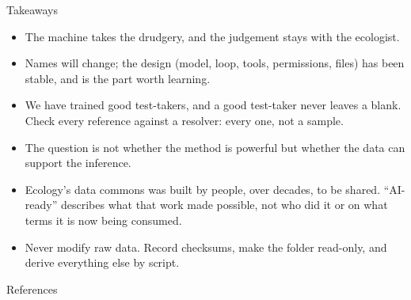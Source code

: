\documentclass[11pt,aspectratio=169]{beamer}
\begin{document}
\begin{frame}{Takeaways}
  \small
  \begin{itemize}
    \item The machine takes the drudgery, and the judgement stays with the
      ecologist.
    \item Names will change; the design (model, loop, tools, permissions,
      files) has been stable, and is the part worth learning.
    \item We have trained good test-takers, and a good test-taker never
      leaves a blank. Check every reference against a resolver: every one,
      not a sample.
    \item The question is not whether the method is powerful but whether the
      data can support the inference.
    \item Ecology's data commons was built by people, over decades, to be
      shared. ``AI-ready'' describes what that work made possible, not who did
      it or on what terms it is now being consumed.
    \item Never modify raw data. Record checksums, make the folder read-only,
      and derive everything else by script.
  \end{itemize}
\end{frame}

\begin{frame}[allowframebreaks]{References}
  \printbibliography[heading=none]
\end{frame}
\end{document}
